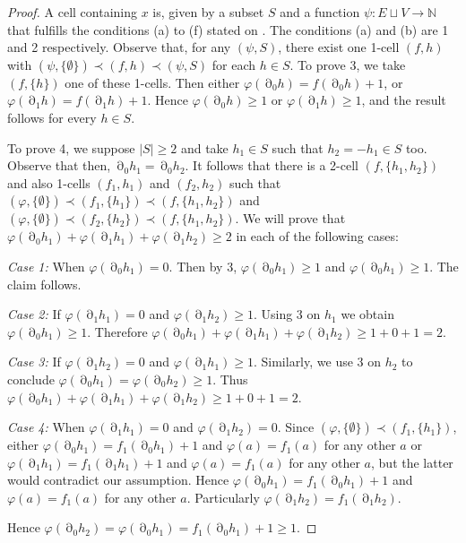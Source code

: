 \documentclass{article}
\DeclareMathOperator{\bnd}{\partial}
\newcommand{\bbN}{\mathbb{N}}
\begin{document}
\begin{proof}

A cell containing $x$ is, given by a subset $S$ and a function $\psi: E\sqcup V \to \bbN$ that fulfills the conditions (a) to (f) stated on . The conditions (a) and (b) are 1 and 2 respectively. Observe that, for any $(\psi, S)$, there exist one 1-cell $(f,h)$ with $(\psi, \{\emptyset\})\prec (f,h)\prec (\psi, S)$ for each $h\in S$. To prove 3, we take $(f, \{h\})$ one of these 1-cells. Then either $\varphi(\bnd_0h)= f(\bnd_0h) +1$, or $\varphi(\bnd_1h)= f(\bnd_1h) +1$. Hence $\varphi(\bnd_0h)\geq 1$ or $\varphi(\bnd_1h)\geq 1$, and the result follows for every $h\in S$.

To prove 4, we suppose $\mid S\mid \geq 2$ and take $h_1\in S$ such that $h_2=-h_1\in S$ too. Observe that then, $\bnd_0 h_1 = \bnd_0 h_2$. It follows that there is a 2-cell $(f, \{h_1, h_2\})$ and also 1-cells $(f_1, h_1)$ and $(f_2, h_2)$ such that $(\varphi, \{\emptyset\})\prec (f_1, \{h_1\})\prec (f, \{h_1, h_2\})$ and $(\varphi, \{\emptyset\})\prec (f_2, \{h_2\})\prec (f, \{h_1, h_2\})$. We will prove that $\varphi(\bnd_0 h_1)+ \varphi(\bnd_1 h_1) +\varphi(\bnd_1 h_2)\geq 2$ in each of the following cases:

\textit{Case 1:} When $\varphi(\bnd_0 h_1)=0$. Then by 3, $\varphi(\bnd_0 h_1)\geq 1$ and $\varphi(\bnd_0 h_1)\geq 1$. The claim follows.

\textit{Case 2:} If $\varphi(\bnd_1 h_1)=0$ and $\varphi(\bnd_1 h_2)\geq 1$. Using 3 on $h_1$ we obtain $\varphi(\bnd_0 h_1)\geq 1$. Therefore $\varphi(\bnd_0 h_1)+ \varphi(\bnd_1 h_1) +\varphi(\bnd_1 h_2)\geq 1 + 0 +1 =2$.

\textit{Case 3:} If $\varphi(\bnd_1 h_2)=0$ and $\varphi(\bnd_1 h_1)\geq 1$. Similarly, we use 3 on $h_2$ to conclude $\varphi(\bnd_0 h_1) = \varphi(\bnd_0 h_2)\geq 1$. Thus $\varphi(\bnd_0 h_1)+ \varphi(\bnd_1 h_1) +\varphi(\bnd_1 h_2)\geq 1 + 0 +1 =2$.

\textit{Case 4:} When $\varphi(\bnd_1 h_1)=0$ and $\varphi(\bnd_1 h_2)= 0$. Since $(\varphi, \{\emptyset\})\prec (f_1, \{h_1\})$, either $\varphi(\bnd_0 h_1)= f_1(\bnd_0 h_1)+1$ and $\varphi(a)=f_1(a)$ for any other $a$ or $\varphi(\bnd_1 h_1)= f_1(\bnd_1 h_1)+1$ and $\varphi(a)=f_1(a)$ for any other $a$, but the latter would contradict our assumption. Hence $\varphi(\bnd_0 h_1)= f_1(\bnd_0 h_1)+1$ and $\varphi(a)=f_1(a)$ for any other $a$. Particularly  $\varphi(\bnd_1h_2)=f_1(\bnd_1 h_2)$. 

  Hence $\varphi(\bnd_0 h_2)= \varphi(\bnd_0h_1)=f_1(\bnd_0 h_1) +1 \geq 1$.


\end{proof}
\end{document}
